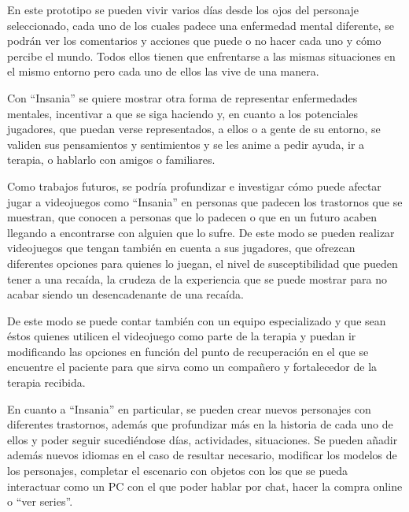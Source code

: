 \documentclass[12pt, a4paper,twoside,titlepage]{book}
\let\origdoublepage\cleardoublepage
\renewcommand{\cleardoublepage}{\clearpage{\pagestyle{empty}\origdoublepage}}
\begin{document}
En este prototipo se pueden vivir varios días desde los ojos del personaje seleccionado, cada uno de los cuales padece una enfermedad mental diferente, se podrán ver los comentarios y acciones que puede o no hacer cada uno y cómo percibe el mundo. Todos ellos tienen que enfrentarse a las mismas situaciones en el mismo entorno pero cada uno de ellos las vive de una manera. 

Con ``Insania'' se quiere mostrar otra forma de representar enfermedades mentales, incentivar a que se siga haciendo y, en cuanto a los potenciales jugadores, que puedan verse representados, a ellos o a gente de su entorno, se validen sus pensamientos y sentimientos y se les anime a pedir ayuda, ir a terapia, o hablarlo con amigos o familiares. 


Como trabajos futuros, se podría profundizar e investigar cómo puede afectar jugar a videojuegos como ``Insania'' en personas que padecen los trastornos que se muestran, que conocen a personas que lo padecen o que en un futuro acaben llegando a encontrarse con alguien que lo sufre. De este modo se pueden realizar videojuegos que tengan también en cuenta a sus jugadores, que ofrezcan diferentes opciones para quienes lo juegan, el nivel de susceptibilidad que pueden tener a una recaída, la crudeza de la experiencia que se puede mostrar para no acabar siendo un desencadenante de una recaída. 

De este modo se puede contar también con un equipo especializado y que sean éstos quienes utilicen el videojuego como parte de la terapia y puedan ir modificando las opciones en función del punto de recuperación en el que se encuentre el paciente para que sirva como un compañero y fortalecedor de la terapia recibida. 

En cuanto a ``Insania'' en particular, se pueden crear nuevos personajes con diferentes trastornos, además que profundizar más en la historia de cada uno de ellos y poder seguir sucediéndose días, actividades, situaciones. Se pueden añadir además nuevos idiomas en el caso de resultar necesario, modificar los modelos de los personajes, completar el escenario con objetos con los que se pueda interactuar como un PC con el que poder hablar por chat, hacer la compra online o ``ver series''.   



\cleardoublepage
{}
{}


\printbibliography
% 
%
%
\end{document}
